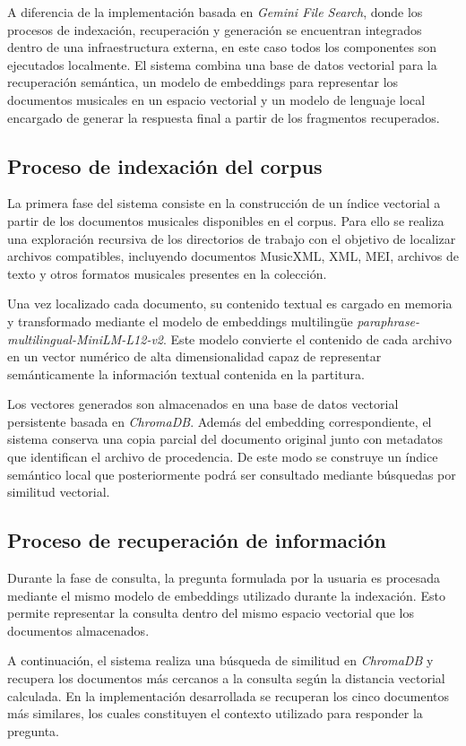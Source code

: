 A diferencia de la implementación basada en \textit{Gemini File Search}, donde los procesos de indexación, recuperación y generación se encuentran integrados dentro de una infraestructura externa, en este caso todos los componentes son ejecutados localmente. El sistema combina una base de datos vectorial para la recuperación semántica, un modelo de embeddings para representar los documentos musicales en un espacio vectorial y un modelo de lenguaje local encargado de generar la respuesta final a partir de los fragmentos recuperados.

\subsection{Proceso de indexación del corpus}
La primera fase del sistema consiste en la construcción de un índice vectorial a partir de los documentos musicales disponibles en el corpus. Para ello se realiza una exploración recursiva de los directorios de trabajo con el objetivo de localizar archivos compatibles, incluyendo documentos MusicXML, XML, MEI, archivos de texto y otros formatos musicales presentes en la colección.

Una vez localizado cada documento, su contenido textual es cargado en memoria y transformado mediante el modelo de embeddings multilingüe \textit{paraphrase-multilingual-MiniLM-L12-v2}. Este modelo convierte el contenido de cada archivo en un vector numérico de alta dimensionalidad capaz de representar semánticamente la información textual contenida en la partitura.

Los vectores generados son almacenados en una base de datos vectorial persistente basada en \textit{ChromaDB}. Además del embedding correspondiente, el sistema conserva una copia parcial del documento original junto con metadatos que identifican el archivo de procedencia. De este modo se construye un índice semántico local que posteriormente podrá ser consultado mediante búsquedas por similitud vectorial.

\subsection{Proceso de recuperación de información}
Durante la fase de consulta, la pregunta formulada por la usuaria es procesada mediante el mismo modelo de embeddings utilizado durante la indexación. Esto permite representar la consulta dentro del mismo espacio vectorial que los documentos almacenados.

A continuación, el sistema realiza una búsqueda de similitud en \textit{ChromaDB} y recupera los documentos más cercanos a la consulta según la distancia vectorial calculada. En la implementación desarrollada se recuperan los cinco documentos más similares, los cuales constituyen el contexto utilizado para responder la pregunta.

